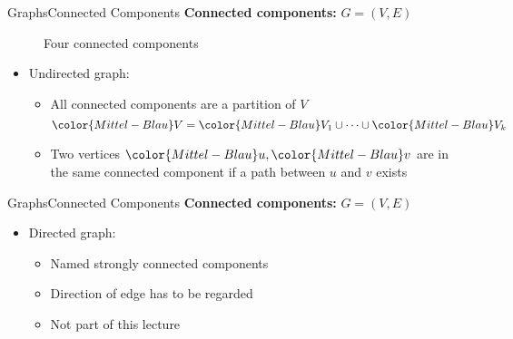 \begin{frame}{Graphs}{Connected Components}
  \textbf{Connected components:}
      {\color{Mittel-Blau}$G = (V , E)$}
  \begin{figure}
    \begin{adjustbox}{width=0.65\linewidth}
      
    \end{adjustbox}
    \caption{Four connected components}
    \label{fig:graph:connected_components}
  \end{figure}   
  \begin{itemize}
    \item<2->
      Undirected graph:
      \begin{itemize}
        \item<3->
          All connected components are a partition of {\color{Mittel-Blau}$V$}
          \begin{displaymath}
            {\color{Mittel-Blau}V}
              = {\color{Mittel-Blau}V_1} \cup \dots \cup 
              {\color{Mittel-Blau}V_k}
          \end{displaymath}
        \item<4->
          Two vertices ${\color{Mittel-Blau}u}, {\color{Mittel-Blau}v}$
          are in the same connected component if a path between
          {\color{Mittel-Blau}$u$} and {\color{Mittel-Blau}$v$} exists
      \end{itemize}
  \end{itemize}
\end{frame}


\begin{frame}{Graphs}{Connected Components}
  \textbf{Connected components:}
  {\color{Mittel-Blau}$G = (V , E)$}
  \begin{itemize}
    \item<2->
      Directed graph:
      \begin{itemize}
        \item<3->
          Named {\color{Mittel-Blau}strongly connected components}
        \item<4->
          Direction of edge has to be regarded
        \item<5->
          Not part of this lecture
      \end{itemize}
  \end{itemize}
\end{frame}

